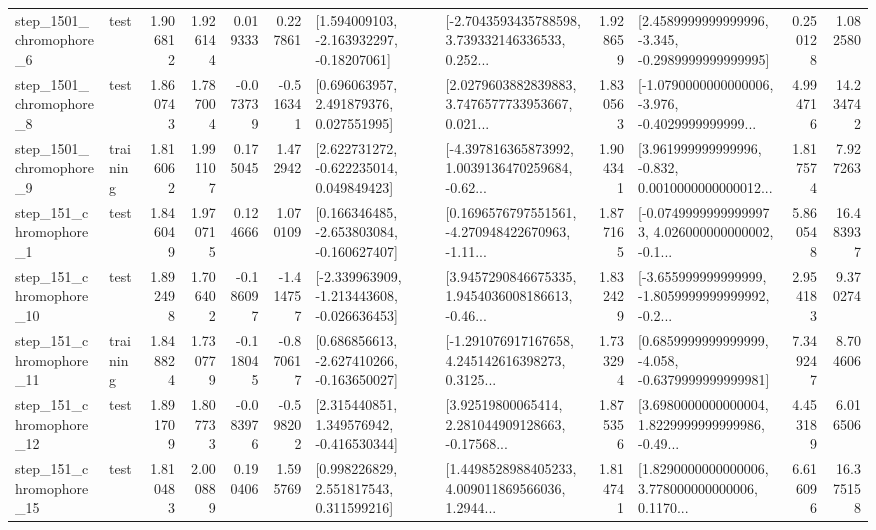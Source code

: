 \begin{tabular}{llrrrrllrlrr}
  step\_1501\_chromophore\_6 &      test &      1.906812 &    1.926144 &      0.019333 &  0.227861 &    [1.594009103, -2.163932297, -0.18207061] &  [-2.7043593435788598, 3.739332146336533, 0.252... &       1.928659 &  [2.4589999999999996, -3.345, -0.2989999999999995] &            0.250128 &          1.082580 \\
  step\_1501\_chromophore\_8 &      test &      1.860743 &    1.787004 &     -0.073739 & -0.516341 &     [0.696063957, 2.491879376, 0.027551995] &  [2.0279603882839883, 3.7476577733953667, 0.021... &       1.830563 &  [-1.0790000000000006, -3.976, -0.4029999999999... &            4.994716 &         14.234742 \\
  step\_1501\_chromophore\_9 &  training &      1.816062 &    1.991107 &      0.175045 &  1.472942 &    [2.622731272, -0.622235014, 0.049849423] &  [-4.397816365873992, 1.0039136470259684, -0.62... &       1.904341 &  [3.961999999999996, -0.832, 0.0010000000000012... &            1.817574 &          7.927263 \\
   step\_151\_chromophore\_1 &      test &      1.846049 &    1.970715 &      0.124666 &  1.070109 &   [0.166346485, -2.653803084, -0.160627407] &  [0.1696576797551561, -4.270948422670963, -1.11... &       1.877165 &  [-0.07499999999999973, 4.026000000000002, -0.1... &            5.860548 &         16.483937 \\
  step\_151\_chromophore\_10 &      test &      1.892498 &    1.706402 &     -0.186097 & -1.414757 &  [-2.339963909, -1.213443608, -0.026636453] &  [3.9457290846675335, 1.9454036008186613, -0.46... &       1.832429 &  [-3.655999999999999, -1.8059999999999992, -0.2... &            2.954183 &          9.370274 \\
  step\_151\_chromophore\_11 &  training &      1.848824 &    1.730779 &     -0.118045 & -0.870617 &   [0.686856613, -2.627410266, -0.163650027] &  [-1.291076917167658, 4.245142616398273, 0.3125... &       1.733294 &  [0.6859999999999999, -4.058, -0.6379999999999981] &            7.349247 &          8.704606 \\
  step\_151\_chromophore\_12 &      test &      1.891709 &    1.807733 &     -0.083976 & -0.598202 &    [2.315440851, 1.349576942, -0.416530344] &  [3.92519800065414, 2.281044909128663, -0.17568... &       1.875356 &  [3.6980000000000004, 1.8229999999999986, -0.49... &            4.453189 &          6.016506 \\
  step\_151\_chromophore\_15 &      test &      1.810483 &    2.000889 &      0.190406 &  1.595769 &     [0.998226829, 2.551817543, 0.311599216] &  [1.4498528988405233, 4.009011869566036, 1.2944... &       1.814741 &  [1.8290000000000006, 3.778000000000006, 0.1170... &            6.616096 &         16.375158 \\

\end{tabular}

